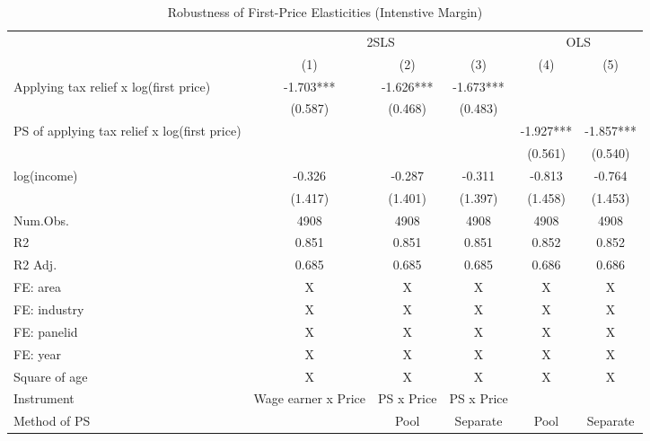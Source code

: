 \documentclass[
  11pt,
  a4paper,
]{article}
\begin{document}
\begin{table}

\caption{\label{tab:rob1intensive}Robustness of First-Price Elasticities (Intenstive Margin)}
\centering
\begin{tabular}[t]{lccccc}
\toprule
\multicolumn{1}{c}{ } & \multicolumn{3}{c}{2SLS} & \multicolumn{2}{c}{OLS} \\
\cmidrule(l{3pt}r{3pt}){2-4} \cmidrule(l{3pt}r{3pt}){5-6}
  & (1) & (2) & (3) & (4) & (5)\\
\midrule
Applying tax relief x log(first price) & -1.703*** & -1.626*** & -1.673*** &  & \\
 & (0.587) & (0.468) & (0.483) &  & \\
PS of applying tax relief x log(first price) &  &  &  & -1.927*** & -1.857***\\
 &  &  &  & (0.561) & (0.540)\\
log(income) & -0.326 & -0.287 & -0.311 & -0.813 & -0.764\\
 & (1.417) & (1.401) & (1.397) & (1.458) & (1.453)\\
\midrule
Num.Obs. & 4908 & 4908 & 4908 & 4908 & 4908\\
R2 & 0.851 & 0.851 & 0.851 & 0.852 & 0.852\\
R2 Adj. & 0.685 & 0.685 & 0.685 & 0.686 & 0.686\\
FE: area & X & X & X & X & X\\
FE: industry & X & X & X & X & X\\
FE: panelid & X & X & X & X & X\\
FE: year & X & X & X & X & X\\
Square of age & X & X & X & X & X\\
Instrument & Wage earner x Price & PS x Price & PS x Price &  & \\
Method of PS &  & Pool & Separate & Pool & Separate\\
\bottomrule
\end{tabular}
\end{table}
\end{document}
